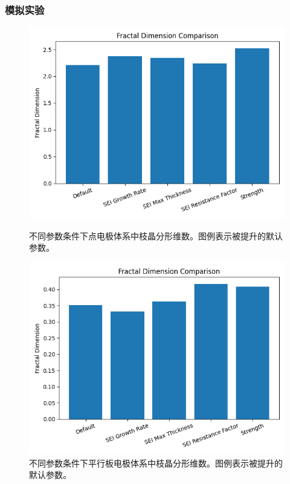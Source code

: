 \documentclass{article}
\begin{document}
 \subsubsection{模拟实验}
      \begin{figure}[H]
             \centering
             \begin{minipage}{0.45\textwidth}
 \centering
  \includegraphics[scale=0.45]{figs/point_fractal_dimension_comparison.png}
 \caption{不同参数条件下点电极体系中枝晶分形维数。图例表示被提升的默认参数。}
             \end{minipage}
             \hfill %
             \begin{minipage}{0.45\textwidth}
  \centering
  \includegraphics[scale=0.45]{figs/parallel_fractal_dimension_comparison.png}
 \caption{不同参数条件下平行板电极体系中枝晶分形维数。图例表示被提升的默认参数。}
             \end{minipage}
         \end{figure}
\end{document}
